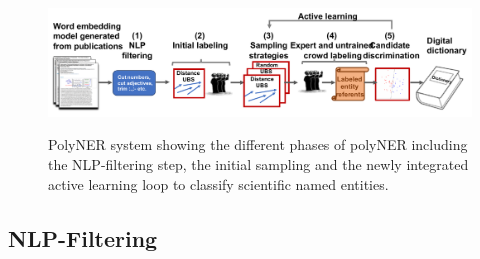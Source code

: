 \begin{figure}[!t]
{\includegraphics[width=\textwidth]{figures/architecture.pdf}}
\caption{\label{fig:architecture} PolyNER system showing the different phases of polyNER including the NLP-filtering step, the initial sampling and the newly integrated active learning loop to classify scientific named entities. 
}
\end{figure}

\subsection{NLP-Filtering}\label{sec:filter}

